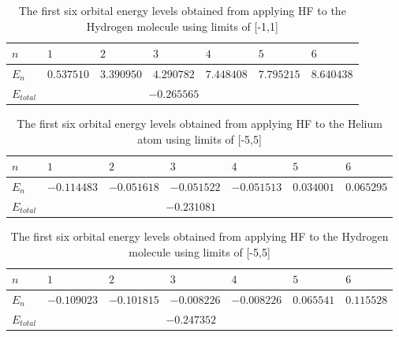 \documentclass[10pt, oneside, letterpaper]{article}
\begin{document}
\begin{table}[H]
\begin{center}
\begin{tabular}{l|llllll}\hline
$n$    & $1$    & $2$     & $3$     & $4$      & $5$      & $6$      \\\hline
$E_n$  & $0.537510$  & $3.390950$  & $4.290782$  & $7.448408$  & $7.795215$  & $8.640438$ \\\hline
$E_{total}$ & \multicolumn{5}{c}{$-0.265565$} \\\hline
\end{tabular}
\end{center}
  \caption{The first six orbital energy levels obtained from applying HF to the Hydrogen molecule using limits of [-1,1]}
  \label{orbital-energies-h2-l1}
\end{table}

\begin{table}[H]
\begin{center}
\begin{tabular}{l|llllll}\hline
$n$    & $1$    & $2$     & $3$     & $4$      & $5$      & $6$      \\\hline
$E_n$  & $-0.114483$  & $-0.051618$  & $-0.051522$  & $-0.051513$  & $0.034001$  & $0.065295$ \\\hline
$E_{total}$ & \multicolumn{5}{c}{$-0.231081$} \\\hline
\end{tabular}
\end{center}
  \caption{The first six orbital energy levels obtained from applying HF to the Helium atom using limits of [-5,5]}
  \label{orbital-energies-he-l5}
\end{table}

\begin{table}[H]
\begin{center}
\begin{tabular}{l|llllll}\hline
$n$    & $1$    & $2$     & $3$     & $4$      & $5$      & $6$      \\\hline
$E_n$  & $-0.109023$  & $-0.101815$  & $-0.008226$  & $-0.008226$  & $0.065541$  & $0.115528$ \\\hline
$E_{total}$ & \multicolumn{5}{c}{$-0.247352$} \\\hline
\end{tabular}
\end{center}
  \caption{The first six orbital energy levels obtained from applying HF to the Hydrogen molecule using limits of [-5,5]}
  \label{orbital-energies-h2-l5}
\end{table}
\end{document}
